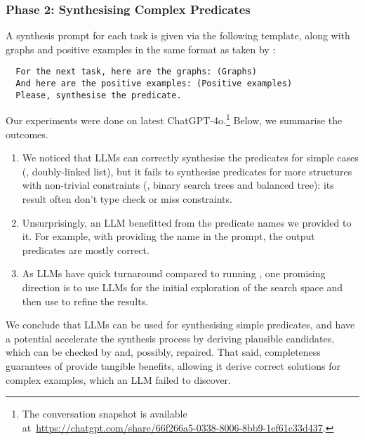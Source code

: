 \subsubsection*{Phase 2: Synthesising Complex Predicates}

A synthesis prompt for each task is given via the following template,
along with graphs and positive examples in the same format as taken by
\tool:

\begin{verbatim}
  For the next task, here are the graphs: (Graphs)
  And here are the positive examples: (Positive examples)
  Please, synthesise the predicate.
\end{verbatim}


\noindent
%
Our experiments were done on latest ChatGPT-4o.\footnote{The
  conversation snapshot is available
  at~\url{https://chatgpt.com/share/66f266a5-0338-8006-8bb9-1ef61c33d437}.}
%
%
Below, we summarise the outcomes.
%
\begin{enumerate}
%
\item We noticed that LLMs can correctly synthesise the predicates for
  simple cases (\eg, doubly-linked list), but it fails to synthesise
  predicates for more structures with non-trivial constraints (\eg, binary search
  trees and balanced tree): its result often don't type check or miss
  constraints.
%
\item Unsurprisingly, an LLM benefitted from the predicate names we
  provided to it. For example, with providing the name 
  in the prompt, the output predicates are mostly correct.
%
\item As LLMs have quick turnaround compared to running \tool, one
  promising direction is to use
  LLMs for the initial exploration of the search space and then use
  \tool to refine the results. 
%
\end{enumerate}

\noindent
%
We conclude that LLMs can be used for synthesising simple predicates,
and have a potential accelerate the synthesis process by deriving
plausible candidates, which can be checked by \prolog and, possibly,
repaired.
%
That said, completeness guarantees of \tool provide tangible benefits,
allowing it derive correct solutions for complex examples, which an
LLM failed to discover.
